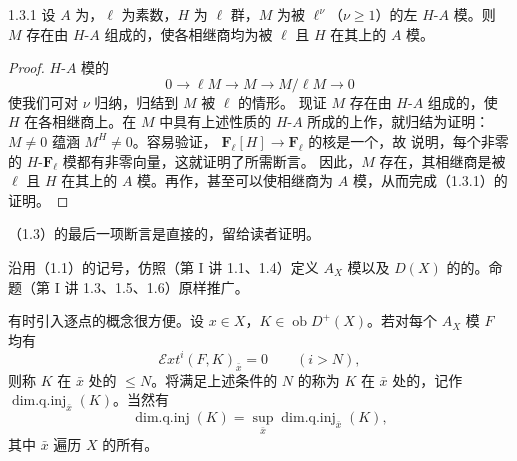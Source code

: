 \begin{SGAresult}{}{1.3.1}
设 $A$ 为，$\ell$ 为素数，$H$ 为 $\ell$ 群，$M$ 为被 $\ell^\nu$（$\nu\geq1$）的左 $H$-$A$ 模。则 $M$ 存在由 $H$-$A$ 组成的，使各相继商均为被 $\ell$ 且 $H$ 在其上的 $A$ 模。
\end{SGAresult}
\begin{proof}
$H$-$A$ 模的
\[
0\longrightarrow\ell M\longrightarrow M\longrightarrow M/\ell M\longrightarrow0
\]
使我们可对 $\nu$ 归纳，归结到 $M$ 被 $\ell$ 的情形。
现证 $M$ 存在由 $H$-$A$ 组成的，使 $H$ 在各相继商上。在 $M$ 中具有上述性质的 $H$-$A$ 所成的上作，就归结为证明：$M\ne0$ 蕴涵 $M^H\ne0$。容易验证， $\mathbf F_\ell[H]\to\mathbf F_\ell$ 的核是一个，故 说明，每个非零的 $H$-$\mathbf F_\ell$ 模都有非零向量，这就证明了所需断言。
因此，$M$ 存在，其相继商是被 $\ell$ 且 $H$ 在其上的 $A$ 模。再作，甚至可以使相继商为 $A$ 模，从而完成（1.3.1）的证明。
\end{proof}
（1.3）的最后一项断言是直接的，留给读者证明。

沿用（1.1）的记号，仿照（第 I 讲 1.1、1.4）定义 $A_X$ 模以及 $D(X)$ 的的。命题（第 I 讲 1.3、1.5、1.6）原样推广。

有时引入逐点的概念很方便。设 $x\in X$，$K\in\operatorname{ob}D^+(X)$。若对每个 $A_X$ 模 $F$ 均有
\[
\mathcal Ext^i(F,K)_{\bar x}=0\qquad(i>N),
\]
则称 $K$ 在 $\bar x$ 处的 $\leq N$。将满足上述条件的 $N$ 的称为 $K$ 在 $\bar x$ 处的，记作 $\operatorname{dim.q.inj}_{\bar x}(K)$。当然有
\[
\operatorname{dim.q.inj}(K)=\sup_{\bar x}\operatorname{dim.q.inj}_{\bar x}(K),
\]
其中 $\bar x$ 遍历 $X$ 的所有。

